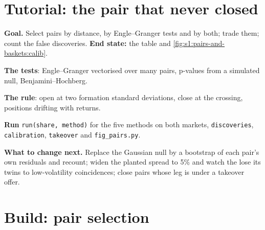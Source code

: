 \section{Tutorial: the pair that never closed}\label{tut:s1:pairs-and-baskets:tut}

\begin{tutorial}
\textbf{Goal.} Select pairs by distance, by Engle--Granger tests and by both; trade them; count the false discoveries. \textbf{End state:} the table and
\cref{fig:s1:pairs-and-baskets:calib}.
\begin{tutsteps}
\item \textbf{The tests}: Engle--Granger vectorised over many pairs, p-values from a simulated null, Benjamini--Hochberg.
\label{lst:s1:pairs-and-baskets:eg}
\item \textbf{The rule}: open at two formation standard deviations, close at the crossing, positions drifting with returns.
\label{lst:s1:pairs-and-baskets:rule}
\item \textbf{Run} \texttt{run(share, method)} for the five methods on both markets, \texttt{discoveries}, \texttt{calibration}, \texttt{takeover} and
\texttt{fig\_pairs.py}.
\end{tutsteps}
\textbf{What to change next.} Replace the Gaussian null by a bootstrap of each pair's own residuals and recount; widen the planted spread to 5\% and watch the
 lose its twins to low-volatility coincidences; close pairs whose leg is under a takeover offer.
\end{tutorial}

\section{Build: pair selection}\label{bld:s1:pairs-and-baskets:pairsel}

